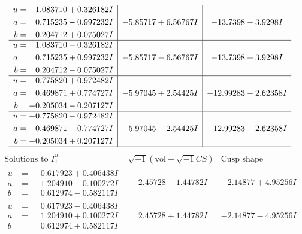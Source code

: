 \documentclass[1p]{elsarticle_modified}
\theoremstyle{definition}
\newcommand{\I}{\sqrt{-1}}
\begin{document}
$$\begin{array}{c|c|c}
\begin{aligned}
u &= \phantom{-}1.083710 + 0.326182 I \\
a &= \phantom{-}0.715235 - 0.997232 I \\
b &= \phantom{-}0.204712 + 0.075027 I\end{aligned}
 & -5.85717 + 6.56767 I & -13.7398 - 3.9298 I \\ \hline\begin{aligned}
u &= \phantom{-}1.083710 - 0.326182 I \\
a &= \phantom{-}0.715235 + 0.997232 I \\
b &= \phantom{-}0.204712 - 0.075027 I\end{aligned}
 & -5.85717 - 6.56767 I & -13.7398 + 3.9298 I \\ \hline\begin{aligned}
u &= -0.775820 + 0.972482 I \\
a &= \phantom{-}0.469871 + 0.774727 I \\
b &= -0.205034 - 0.207127 I\end{aligned}
 & -5.97045 + 2.54425 I & -12.99283 - 2.62358 I \\ \hline\begin{aligned}
u &= -0.775820 - 0.972482 I \\
a &= \phantom{-}0.469871 - 0.774727 I \\
b &= -0.205034 + 0.207127 I\end{aligned}
 & -5.97045 - 2.54425 I & -12.99283 + 2.62358 I\\
 \hline 
 \end{array}$$\newpage$$\begin{array}{c|c|c}  
\text{Solutions to }I^u_{1}& \I (\text{vol} + \sqrt{-1}CS) & \text{Cusp shape}\\
 \hline 
\begin{aligned}
u &= \phantom{-}0.617923 + 0.406438 I \\
a &= \phantom{-}1.204910 - 0.100272 I \\
b &= \phantom{-}0.612974 - 0.582117 I\end{aligned}
 & \phantom{-}2.45728 - 1.44782 I & -2.14877 + 4.95256 I \\ \hline\begin{aligned}
u &= \phantom{-}0.617923 - 0.406438 I \\
a &= \phantom{-}1.204910 + 0.100272 I \\
b &= \phantom{-}0.612974 + 0.582117 I\end{aligned}
 & \phantom{-}2.45728 + 1.44782 I & -2.14877 - 4.95256 I \\ \hline\begin{aligned}

\end{aligned}
\end{array}$$
\end{document}
